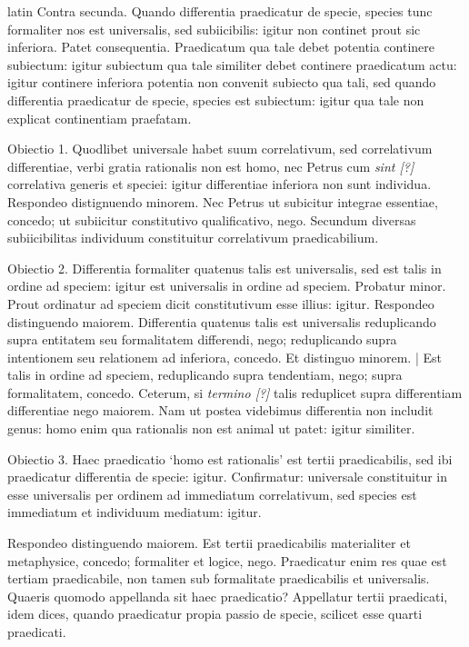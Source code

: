 \begin{otherlanguage*}{latin}
\pstart
Contra secunda. Quando differentia praedicatur de specie, species tunc formaliter nos est universalis, sed subiicibilis:
igitur non continet prout sic inferiora. Patet consequentia. Praedicatum qua tale debet potentia continere subiectum:
igitur subiectum qua tale similiter debet continere praedicatum actu:
igitur continere inferiora potentia non convenit subiecto qua tali, sed quando differentia praedicatur de specie, species est subiectum:
igitur qua tale non explicat continentiam praefatam. 
\pend

\pstart
Obiectio 1. Quodlibet universale habet suum correlativum, sed correlativum differentiae, verbi gratia rationalis non est homo, nec Petrus cum \emph{sint [?]} correlativa generis et speciei:
igitur differentiae inferiora non sunt individua. Respondeo distignuendo minorem. Nec Petrus ut subicitur integrae essentiae, concedo; ut subiicitur constitutivo qualificativo, nego. Secundum diversas subiicibilitas individuum constituitur correlativum praedicabilium. 
\pend

\pstart
Obiectio 2. Differentia formaliter quatenus talis est universalis, sed est talis in ordine ad speciem:
igitur est universalis in ordine ad speciem. Probatur minor. Prout ordinatur ad speciem dicit constitutivum esse illius:
igitur. Respondeo distinguendo maiorem. Differentia quatenus talis est universalis reduplicando supra entitatem seu formalitatem differendi, nego; reduplicando supra intentionem seu relationem ad inferiora, concedo. Et distinguo minorem. \textnormal{|} Est talis in ordine ad speciem, reduplicando supra tendentiam, nego; supra formalitatem, concedo. Ceterum, si \emph{termino [?]} talis reduplicet supra differentiam differentiae nego maiorem. Nam ut postea videbimus differentia non includit genus:
homo enim qua rationalis non est animal ut patet:
igitur similiter. 
\pend

\pstart
Obiectio 3. Haec praedicatio `homo est rationalis' est tertii praedicabilis, sed ibi praedicatur differentia de specie:
igitur. Confirmatur:
universale constituitur in esse universalis per ordinem ad immediatum correlativum, sed species est immediatum et individuum mediatum:
igitur. 
\pend

\pstart
Respondeo distinguendo maiorem. Est tertii praedicabilis materialiter et metaphysice, concedo; formaliter et logice, nego. Praedicatur enim res quae est tertiam praedicabile, non tamen sub formalitate praedicabilis et universalis. Quaeris quomodo appellanda sit haec praedicatio? Appellatur tertii praedicati, idem dices, quando praedicatur propia passio de specie, scilicet esse quarti praedicati. 
\pend


\end{otherlanguage*}
